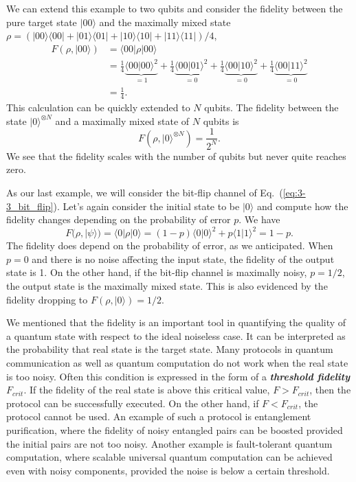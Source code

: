 We can extend this example to two qubits and consider the fidelity between the pure target state $|00\rangle$ and the maximally mixed state $\rho = (|00\rangle\langle00|+|01\rangle\langle01|+|10\rangle\langle10|+|11\rangle\langle11|)/4$,
\begin{align}
    F(\rho, |00\rangle) & = \langle00| \rho | 00\rangle \nonumber\\
    & = \frac{1}{4} \underbrace{\langle00|00\rangle^2}_{=1} + \frac{1}{4} \underbrace{\langle00|01\rangle^2}_{=0} + \frac{1}{4} \underbrace{\langle00|10\rangle^2}_{=0} + \frac{1}{4} \underbrace{\langle00|11\rangle^2}_{=0} \nonumber\\
    & = \frac{1}{4}.
\end{align}
This calculation can be quickly extended to $N$ qubits.
The fidelity between the state $|0\rangle^{\otimes N}$ and a maximally mixed state of $N$ qubits is
\begin{equation}
    F(\rho,|0\rangle^{\otimes N}) = \frac{1}{2^N}.
\end{equation}
We see that the fidelity scales with the number of qubits but never quite reaches zero.

As our last example, we will consider the bit-flip channel of Eq.~(\ref{eq:3-3_bit_flip}).
Let's again consider the initial state to be $|0\rangle$ and compute how the fidelity changes depending on the probability of error $p$.
We have
\begin{equation}
    F(\rho,|\psi\rangle) = \langle0| \rho | 0\rangle = (1-p) \langle0|0\rangle^2 + p \langle1|1\rangle^2 = 1 - p.
\end{equation}
The fidelity does depend on the probability of error, as we anticipated.
When $p=0$ and there is no noise affecting the input state, the fidelity of the output state is 1.
On the other hand, if the bit-flip channel is maximally noisy, $p=1/2$, the output state is the maximally mixed state.
This is also evidenced by the fidelity dropping to $F(\rho,|0\rangle)=1/2$.

We mentioned that the fidelity is an important tool in quantifying the quality of a quantum state with respect to the ideal noiseless case.
It can be interpreted as the probability that real state is the target state.
Many protocols in quantum communication as well as quantum computation do not work when the real state is too noisy.
Often this condition is expressed in the form of a \textit{\textbf{threshold fidelity}} $F_{crit}$.
If the fidelity of the real state is above this critical value, $F > F_{crit}$, then the protocol can be successfully executed.
On the other hand, if $F < F_{crit}$, the protocol cannot be used.
An example of such a protocol is entanglement purification, where the fidelity of noisy entangled pairs can be boosted provided the initial pairs are not too noisy.
Another example is fault-tolerant quantum computation, where scalable universal quantum computation can be achieved even with noisy components, provided the noise is below a certain threshold.


